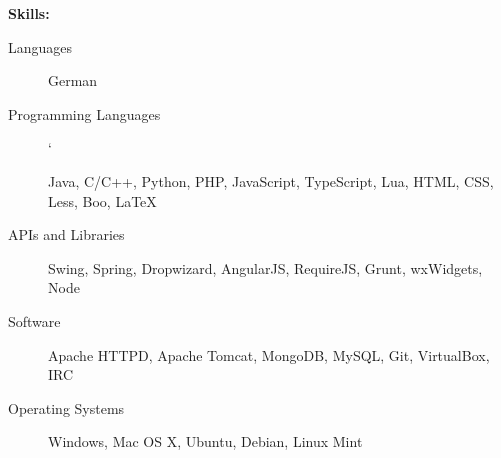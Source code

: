 \documentclass[11pt]{article}
\begin{document}
\bigskip
{\Large \textbf{Skills:}}
\hrulefill
\bigskip
\begin{description}
\item[Languages]
\hfill

German

\item[Programming Languages]
\hfill`

Java, C/C++, Python, PHP, JavaScript, TypeScript, Lua, HTML, CSS, Less,  Boo, LaTeX

\item[APIs and Libraries]
\hfill

Swing, Spring, Dropwizard, AngularJS, RequireJS, Grunt, wxWidgets, Node

\item[Software]
\hfill

Apache HTTPD, Apache Tomcat, MongoDB, MySQL, Git, VirtualBox, IRC

\item[Operating Systems]
\hfill

Windows, Mac OS X, Ubuntu, Debian, Linux Mint
\end{description}
\end{document}
